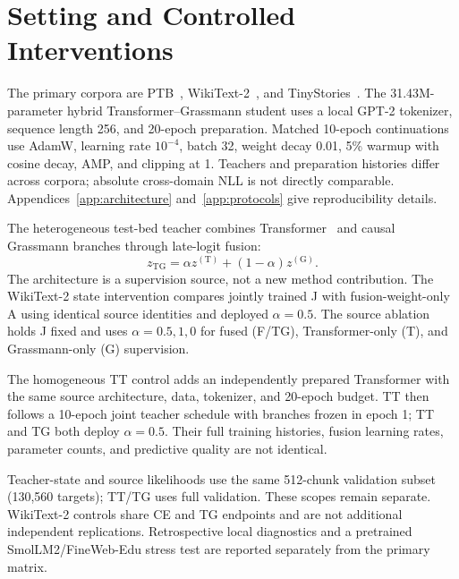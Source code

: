 \section{Setting and Controlled Interventions}\label{sec:experimental-setting}

The primary corpora are PTB~\citep{marcus1993ptb}, WikiText-2~\citep{merity2016wikitext}, and TinyStories~\citep{eldan2023tinystories}. The 31.43M-parameter hybrid Transformer--Grassmann student uses a local GPT-2 tokenizer, sequence length 256, and 20-epoch preparation. Matched 10-epoch continuations use AdamW, learning rate $10^{-4}$, batch 32, weight decay 0.01, 5\% warmup with cosine decay, AMP, and clipping at 1. Teachers and preparation histories differ across corpora; absolute cross-domain NLL is not directly comparable. Appendices~\ref{app:architecture} and~\ref{app:protocols} give reproducibility details.

The heterogeneous test-bed teacher combines Transformer~\citep{vaswani2017attention} and causal Grassmann branches through late-logit fusion:
\begin{equation}
z_{\mathrm{TG}}=\alpha z^{(\mathrm T)}+(1-\alpha)z^{(\mathrm G)}.
\label{eq:teacher-fusion}
\end{equation}
The architecture is a supervision source, not a new method contribution. The WikiText-2 state intervention compares jointly trained J with fusion-weight-only A using identical source identities and deployed $\alpha=0.5$. The source ablation holds J fixed and uses $\alpha=0.5,1,0$ for fused (F/TG), Transformer-only (T), and Grassmann-only (G) supervision.

The homogeneous TT control adds an independently prepared Transformer with the same source architecture, data, tokenizer, and 20-epoch budget. TT then follows a 10-epoch joint teacher schedule with branches frozen in epoch 1; TT and TG both deploy $\alpha=0.5$. Their full training histories, fusion learning rates, parameter counts, and predictive quality are not identical.

Teacher-state and source likelihoods use the same 512-chunk validation subset (130,560 targets); TT/TG uses full validation. These scopes remain separate. WikiText-2 controls share CE and TG endpoints and are not additional independent replications. Retrospective local diagnostics and a pretrained SmolLM2/FineWeb-Edu stress test are reported separately from the primary matrix.

